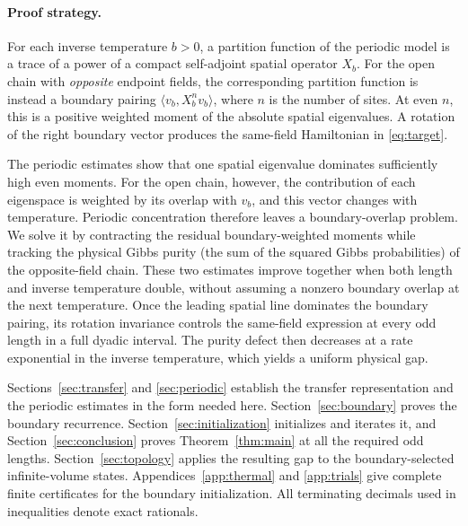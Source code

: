 \documentclass[11pt]{article}
\theoremstyle{remark}
\numberwithin{equation}{section}
\begin{document}
\paragraph{Proof strategy.}
For each inverse temperature $b>0$, a partition function of the
periodic model is a trace of a power of a compact self-adjoint spatial
operator $X_b$. For the open chain with \emph{opposite} endpoint fields,
the corresponding partition function is instead a boundary pairing
$\langle v_b,X_b^n v_b\rangle$, where $n$ is the number of sites.
At even $n$, this is a positive weighted moment of the absolute spatial
eigenvalues. A rotation of the right boundary vector produces the
same-field Hamiltonian in \eqref{eq:target}.

The periodic estimates show that one spatial eigenvalue dominates
sufficiently high even moments. For the open chain, however, the contribution of
each eigenspace is weighted by its overlap with $v_b$, and this vector
changes with temperature. Periodic concentration therefore leaves a
boundary-overlap problem. We solve it by contracting the residual
boundary-weighted moments while tracking the physical Gibbs
purity (the sum of the squared Gibbs probabilities) of the opposite-field
chain. These two estimates improve together
when both length and inverse temperature double, without assuming a
nonzero boundary overlap at the next temperature. Once the leading
spatial line dominates the boundary pairing, its rotation invariance
controls the same-field expression at every odd length in a full
dyadic interval. The purity defect then decreases at a rate exponential
in the inverse temperature, which yields a uniform physical gap.

Sections~\ref{sec:transfer} and \ref{sec:periodic} establish the transfer
representation and the periodic estimates in the form needed here.
Section~\ref{sec:boundary} proves the boundary recurrence.
Section~\ref{sec:initialization} initializes and iterates it, and
Section~\ref{sec:conclusion} proves Theorem~\ref{thm:main} at all the
required odd lengths. Section~\ref{sec:topology} applies the resulting
gap to the boundary-selected infinite-volume states.
Appendices~\ref{app:thermal} and \ref{app:trials}
give complete finite certificates for the boundary initialization.
All terminating decimals used in inequalities denote exact rationals.


\FloatBarrier





\appendix




\end{document}
